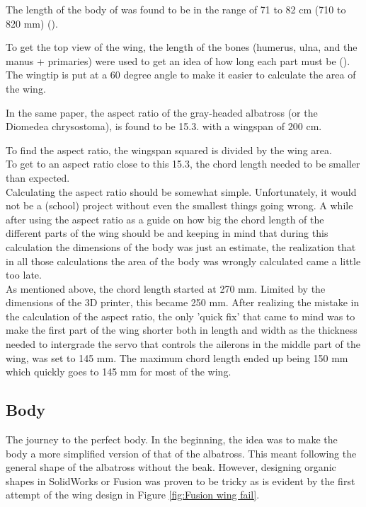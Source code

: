 The length of the body of was found to be in the range of 71 to 82 cm (710 to 820 mm) (\cite{WoRMS}).

To get the top view of the wing, the length of the bones (humerus, ulna, and the manus + primaries) were used to get an idea of how long each part must be (\cite{Wing_shape}). The wingtip is put at a 60 degree angle to make it easier to calculate the area of the wing. 

In the same paper, the aspect ratio of the gray-headed albatross (or the Diomedea chrysostoma), is found to be 15.3. with a wingspan of 200 cm.  

To find the aspect ratio, the wingspan squared is divided by the wing area.\\

To get to an aspect ratio close to this 15.3, the chord length needed to be smaller than expected.\\

Calculating the aspect ratio should be somewhat simple. Unfortunately, it would not be a (school) project without even the smallest things going wrong. A while after using the aspect ratio as a guide on how big the chord length of the different parts of the wing should be and keeping in mind that during this calculation the dimensions of the body was just an estimate, the realization that in all those calculations the area of the body was wrongly calculated came a little too late.\\

As mentioned above, the chord length started at 270 mm. Limited by the dimensions of the 3D printer, this became 250 mm. After realizing the mistake in the calculation of the aspect ratio, the only 'quick fix' that came to mind was to make the first part of the wing shorter both in length and width as the thickness needed to intergrade the servo that controls the ailerons in the middle part of the wing, was set to 145 mm. The maximum chord length ended up being 150 mm which quickly goes to 145 mm for most of the wing.\\

\subsection{Body} 
The journey to the perfect body. In the beginning, the idea was to make the body a more simplified version of that of the albatross. This meant following the general shape of the albatross without the beak. However, designing organic shapes in SolidWorks or Fusion was proven to be tricky as is evident by the first attempt of the wing design in Figure \ref{fig:Fusion wing fail}.\\

